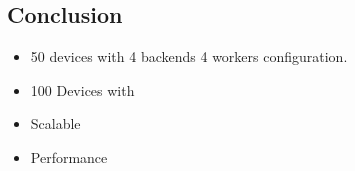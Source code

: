 \documentclass[../thesis.tex]{subfiles}
\begin{document}
\subsection{Conclusion}



\begin{itemize}
	\item 50 devices with 4 backends 4 workers configuration.
	\item 100 Devices with 
\end{itemize}

\begin{itemize}
	\item Scalable
	\item Performance 
\end{itemize}
\end{document}
